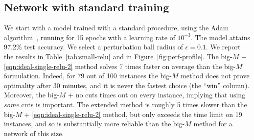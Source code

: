 \documentclass[smallextended]{svjour3}
\begin{document}
\subsection{Network with standard training} \label{ssec:standard-training}
We start with a model trained with a standard procedure, using the Adam algorithm~\cite{Kingma:2014}, running for 15 epochs with a learning rate of $10^{-3}$. The model attains 97.2\% test accuracy. We select a perturbation ball radius of $\epsilon = 0.1$. We report the results in Table~\ref{tab:small-relu} and in Figure~\ref{fig:perf-profile}. The big-$M$ + \eqref{eqn:ideal-single-relu-2} method solves $7$ times faster on average than the big-$M$ formulation. Indeed, for 79 out of 100 instances the big-$M$ method does not prove optimality after 30 minutes, and it is never the fastest choice (the ``win'' column). Moreover, the big-$M$ + no cuts times out on every instance, implying that using \emph{some} cuts is important. The extended method is roughly 5 times slower than the big-$M$ + \eqref{eqn:ideal-single-relu-2} method, but only exceeds the time limit on 19 instances, and so is substantially more reliable than the big-$M$ method for a network of this size.


\end{document}
